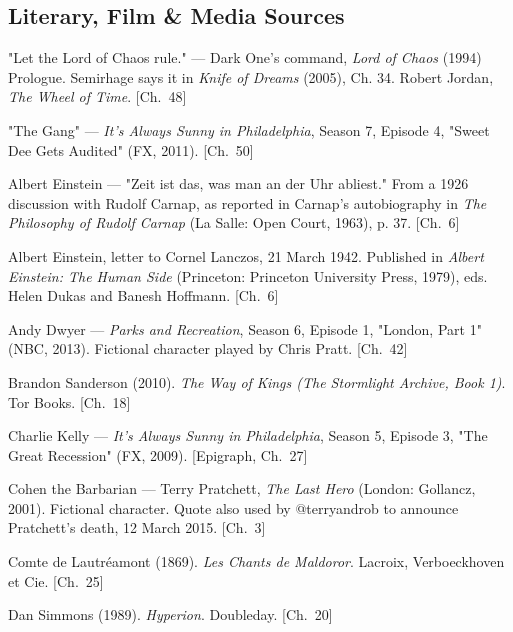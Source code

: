 \subsection*{Literary, Film \& Media Sources}
\vspace{0.3em}
\begin{list}{}{%
  \setlength{\leftmargin}{2em}%
  \setlength{\itemindent}{-2em}%
  \setlength{\itemsep}{0.35\baselineskip}%
  \setlength{\parsep}{0pt}%
  \setlength{\topsep}{0.5em}}
\small
\item "Let the Lord of Chaos rule." — Dark One's command, \textit{Lord of Chaos} (1994) Prologue. Semirhage says it in \textit{Knife of Dreams} (2005), Ch. 34. Robert Jordan, \textit{The Wheel of Time}. \hfill {\scriptsize [Ch.~48]}
\item "The Gang" — \textit{It's Always Sunny in Philadelphia}, Season 7, Episode 4, "Sweet Dee Gets Audited" (FX, 2011). \hfill {\scriptsize [Ch.~50]}
\item Albert Einstein — "Zeit ist das, was man an der Uhr abliest." From a 1926 discussion with Rudolf Carnap, as reported in Carnap's autobiography in \textit{The Philosophy of Rudolf Carnap} (La Salle: Open Court, 1963), p. 37. \hfill {\scriptsize [Ch.~6]}
\item Albert Einstein, letter to Cornel Lanczos, 21 March 1942. Published in \textit{Albert Einstein: The Human Side} (Princeton: Princeton University Press, 1979), eds. Helen Dukas and Banesh Hoffmann. \hfill {\scriptsize [Ch.~6]}
\item Andy Dwyer — \textit{Parks and Recreation}, Season 6, Episode 1, "London, Part 1" (NBC, 2013). Fictional character played by Chris Pratt. \hfill {\scriptsize [Ch.~42]}
\item Brandon Sanderson (2010). \textit{The Way of Kings (The Stormlight Archive, Book 1)}. Tor Books. \hfill {\scriptsize [Ch.~18]}
\item Charlie Kelly — \textit{It's Always Sunny in Philadelphia}, Season 5, Episode 3, "The Great Recession" (FX, 2009). \hfill {\scriptsize [Epigraph, Ch.~27]}
\item Cohen the Barbarian — Terry Pratchett, \textit{The Last Hero} (London: Gollancz, 2001). Fictional character. Quote also used by @terryandrob to announce Pratchett's death, 12 March 2015. \hfill {\scriptsize [Ch.~3]}
\item Comte de Lautréamont (1869). \textit{Les Chants de Maldoror}. Lacroix, Verboeckhoven et Cie. \hfill {\scriptsize [Ch.~25]}
\item Dan Simmons (1989). \textit{Hyperion}. Doubleday. \hfill {\scriptsize [Ch.~20]}

\end{list}
